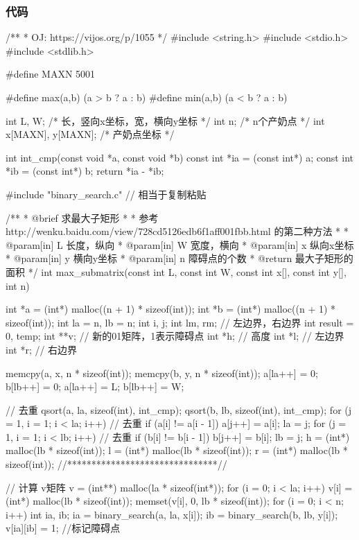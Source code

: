 \subsubsection{代码}
\begin{Codex}[label=cow_bath.c]
/**
 * OJ: https://vijos.org/p/1055
 */
#include <string.h>
#include <stdio.h>
#include <stdlib.h>

#define MAXN 5001

#define max(a,b)  (a > b ? a : b)
#define min(a,b)  (a < b ? a : b)

int L, W; /* 长，竖向x坐标，宽，横向y坐标 */
int n; /* n个产奶点 */
int x[MAXN], y[MAXN]; /* 产奶点坐标 */

int int_cmp(const void *a, const void *b) {
    const int *ia = (const int*) a;
    const int *ib = (const int*) b;
    return *ia - *ib;
}

#include "binary_search.c"  // 相当于复制粘贴

/**
 * @brief 求最大子矩形
 *
 * 参考 http://wenku.baidu.com/view/728cd5126edb6f1aff001fbb.html 的第二种方法
 *
 * @param[in] L 长度，纵向
 * @param[in] W 宽度，横向
 * @param[in] x 纵向x坐标
 * @param[in] y 横向y坐标
 * @param[in] n 障碍点的个数
 * @return 最大子矩形的面积
 */
int max_submatrix(const int L, const int W,
        const int x[], const int y[], int n) {
    int *a = (int*) malloc((n + 1) * sizeof(int));
    int *b = (int*) malloc((n + 1) * sizeof(int));
    int la = n, lb = n;
    int i, j;
    int lm, rm; // 左边界，右边界
    int result = 0, temp;
    int **v;  // 新的01矩阵，1表示障碍点
    int *h;  // 高度
    int *l;  // 左边界
    int *r;  // 右边界

    memcpy(a, x, n * sizeof(int));
    memcpy(b, y, n * sizeof(int));
    a[la++] = 0;
    b[lb++] = 0;
    a[la++] = L;
    b[lb++] = W;

    // 去重
    qsort(a, la, sizeof(int), int_cmp);
    qsort(b, lb, sizeof(int), int_cmp);
    for (j = 1, i = 1; i < la; i++) { // 去重
        if (a[i] != a[i - 1])
            a[j++] = a[i];
    }
    la = j;
    for (j = 1, i = 1; i < lb; i++) { // 去重
        if (b[i] != b[i - 1])
            b[j++] = b[i];
    }
    lb = j;
    h = (int*) malloc(lb * sizeof(int));
    l = (int*) malloc(lb * sizeof(int));
    r = (int*) malloc(lb * sizeof(int));
    //*******************************//

    // 计算 v矩阵
    v = (int**) malloc(la * sizeof(int*));
    for (i = 0; i < la; i++) {
        v[i] = (int*) malloc(lb * sizeof(int));
        memset(v[i], 0, lb * sizeof(int));
    }
    for (i = 0; i < n; i++) {
        int ia, ib;
        ia = binary_search(a, la, x[i]);
        ib = binary_search(b, lb, y[i]);
        v[ia][ib] = 1; //标记障碍点
    }

}
\end{Codex}
